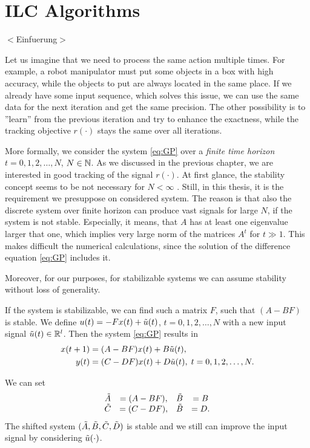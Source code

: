 \chapter{ILC Algorithms}
\label{ch:ILCAlg}
{\color{red} $<$Einfuerung$>$}


Let us imagine that we need to process the same action multiple times. 
For example, a robot manipulator must put some objects in a box with high accuracy, while the objects to put are always located in the same place. If we already have some input sequence, which solves this issue, we can use the same data for the next iteration and get the same precision. The other possibility is to ''learn'' from the previous iteration and try to enhance the exactness, while the tracking objective $r(\cdot)$ stays the same over all iterations.

More formally, we consider the system \eqref{eq:GP} over a \textit{finite time horizon} $t = 0, 1, 2, \dots, N$, $N \in {\mathbb{N}}$. As we discussed in the previous chapter, we are interested in good tracking of the signal $r(\cdot)$. At first glance, the stability concept seems to be not necessary for $N < \infty$ . Still, in this thesis, it is the requirement we presuppose on considered system. The reason is that also the discrete system over finite horizon can produce vast signals for large $N$, if the system is not stable. Especially, it means, that $A$ has at least one eigenvalue larger that one, which implies very large norm of the matrices $A^t$ for $t \gg 1$. This makes difficult the numerical calculations, since the solution of the difference equation \eqref{eq:GP} includes it. 

Moreover, for our purposes, for stabilizable systems we can assume stability without loss of generality. 

If the system is stabilizable, we can find such a matrix $F$, such that $(A - B F )$ is stable. 
We define $u(t) = - Fx(t) + \tilde{u}(t)$, $t = 0,1,2, \dots, N$ with a new input signal $\tilde{u} (t) \in {\mathbb{R}}^l$. Then the system \eqref{eq:GP} results in
\begin{align}
\begin{split}
x(t+1) &= (A - B F)x(t) + B \tilde{u} (t), \\
y(t)   &= (C - D F) x(t) + D\tilde{u}(t), \; t = 0, 1 ,2, \dots, N. 
\end{split}
\end{align}

We can set 
\begin{align}
\begin{array}{c c c c}
\tilde{A} &= (A - B F), &\tilde{B} &= B\\
\tilde{C}  & = (C - D F),&\tilde{B} & = D.
\end{array}
\end{align}
The shifted system $(\tilde{A}, \tilde{B} , \tilde{C}, \tilde{D})$ is stable and we still can improve the input signal by considering $\tilde{u}(\cdot)$.


